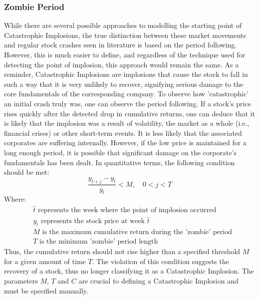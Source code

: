 \documentclass[a4paper]{report}
\begin{document}
\subsubsection{Zombie Period}
While there are several possible approaches to modelling the starting point of Catastrophic Implosions, the true distinction between these market movements and regular stock crashes seen in literature is based on the period following. However, this is much easier to define, and regardless of the technique
used for detecting the point of implosion, this approach would remain the same. As a reminder, Catastrophic Implosions are implosions that cause the stock to fall in such a way that it is very unlikely to recover, signifying serious damage to the core fundamentals of the corresponding company. To observe 
how 'catastrophic' an initial crash truly was, one can observe the period following. If a stock's price rises quickly after the detected drop in cumulative returns, one can deduce that it is likely that the implosion was a result of volatility, the market as a whole 
(i.e., financial crises) or other short-term events. It is less likely that the associated corporates are suffering internally. However, if the low price is maintained for a long enough period, it is possible that significant damage on the corporate's fundamentals has been dealt. 
In quantitative terms, the following condition should be met:
\begin{equation}
  \frac{y_{\hat{t}+j} - y_{\hat{t}}}{y_{\hat{t}}} < M, \quad 0 < j < T
  \label{eq:zombie_condition}
\end{equation} Where:
\begin{align*}
& \hat{t} \text{ represents the week where the point of implosion occurred} \\
& y_{\hat{t}} \text{ represents the stock price at week } \hat{t} \\
& M \text{ is the maximum cumulative return during the 'zombie' period} \\
& T \text{ is the minimum 'zombie' period length}
\end{align*} Thus, the cumulative return should not rise higher than a specified threshold \(M\) for a given amount of time \(T\). The violation of this condition suggests the recovery of a stock, thus no longer classifying it as a Catastrophic Implosion. The parameters \(M\), \(T\) and \(C\)
are crucial to defining a Catastrophic Implosion and must be specified manually.
\end{document}
